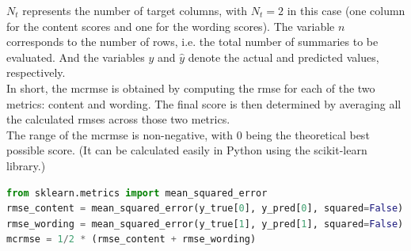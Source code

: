 \noindent $N_t$ represents the number of target columns, with $N_t = 2$ in this case (one column for the content scores and one for the wording scores). The variable $n$ corresponds to the number of rows, i.e. the total number of summaries to be evaluated. And the variables $y$ and $\hat{y}$ denote the actual and predicted values, respectively.\\
In short, the \gls{mcrmse} is obtained by computing the \gls{rmse} for each of the two metrics: content and wording. The final score is then determined by averaging all the calculated \glspl{rmse} across those two metrics.\\
The range of the \gls{mcrmse} is non-negative, with 0 being the theoretical best possible score. (It can be calculated easily in Python
using the scikit-learn
library.)
\begin{lstlisting}[language=Python]
from sklearn.metrics import mean_squared_error
rmse_content = mean_squared_error(y_true[0], y_pred[0], squared=False)
rmse_wording = mean_squared_error(y_true[1], y_pred[1], squared=False)
mcrmse = 1/2 * (rmse_content + rmse_wording)
\end{lstlisting}
